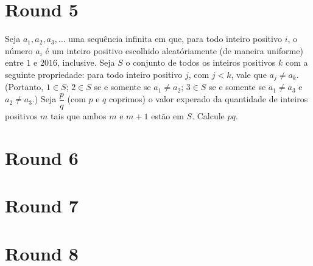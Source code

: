 \documentclass[10pt, a4paper]{article}
\begin{document}
	\section{Round 5}

	\setcounter{prob}{0}
	\begin{prob}
		Seja $a_1, a_2, a_3, \dots$ uma sequência infinita em que, para todo inteiro positivo $i$, o número $a_i$ é um inteiro positivo escolhido aleatóriamente (de maneira uniforme) entre $1$ e $2016$, inclusive. Seja $S$ o conjunto de todos os inteiros positivos $k$ com a seguinte propriedade: para todo inteiro positivo $j$, com $j < k$, vale que $a_j \neq a_k$. (Portanto, $1 \in S$;  $2 \in S$ se e somente se $a_1 \neq a_2$; $3 \in S$ se e somente se $a_1 \neq a_3$ e $a_2 \neq a_3$.) Seja $\dfrac{p}{q}$ (com $p$ e $q$ coprimos) o valor experado da quantidade de inteiros positivos $m$ tais que ambos $m$ e $m+1$ estão em $S$. Calcule $pq$.
	\end{prob}	

	\section{Round 6}


	\section{Round 7}


	\section{Round 8}

\end{document}
